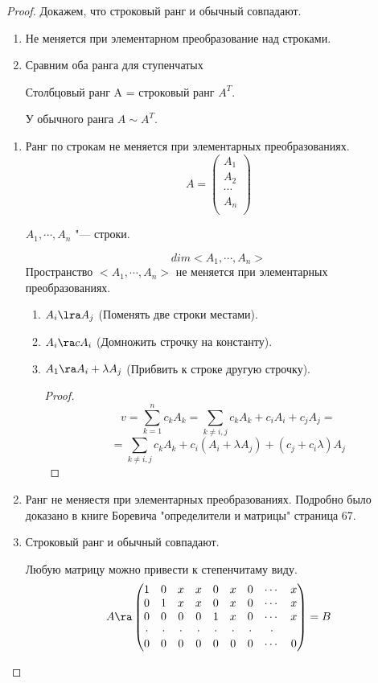\begin{proof}
Докажем, что строковый ранг и обычный совпадают. 
\begin{enumerate}
\item Не меняется при элементарном преобразование над строками.
\item Сравним оба ранга для ступенчатых

Столбцовый ранг A = строковый ранг $A^{T}$.

У обычного ранга $A \sim A^{T}$.

\end{enumerate}

\begin{enumerate}
\item Ранг по строкам не меняется при элементарных преобразованиях.
$$A = \begin{pmatrix}
A_1\\                                         
A_2\\
\cdots\\
A_n\\
\end{pmatrix}$$

$A_1,\cdots, A_n$ "--- строки.

$$dim<A_1, \cdots, A_n>$$ 
Пространство $<A_1, \cdots, A_n>$ не меняется при элементарных преобразованиях.

\begin{enumerate}
\item $A_i \lra A_j$ (Поменять две строки местами).
\item $A_i \ra cA_i$ (Домножить строчку на константу).
\item $A_1 \ra A_i + \lambda A_j$  (Прибвить к строке другую строчку).
      \begin{proof}
      $$v = \sum_{k = 1}^{n} c_k A_k = \sum_{k \ne i, j}c_kA_k + c_iA_i + c_jA_j = $$  
      $$= \sum_{k \ne i, j}c_kA_k + c_i(A_i + \lambda A_j) + (c_j + c_i\lambda)A_j$$
      \end{proof}
\end{enumerate}
\item Ранг не меняестя при элементарных преобразованиях. 
Подробно было доказано в книге Боревича "определители и матрицы" страница 67.
\item  
Строковый ранг и обычный совпадают. 

Любую матрицу можно привести к степенчитаму виду.
$$ 
A \ra
\begin{pmatrix}
1&0&x&x&0&x&0&\cdots&x\\
0&1&x&x&0&x&0&\cdots&x\\
0&0&0&0&1&x&0&\cdots&x\\
\cdot&\cdot&\cdot&\cdot&\cdot&\cdot&\cdot&\cdot\\
0&0&0&0&0&0&0&\cdots&0\\
\end{pmatrix} = B
$$


\end{enumerate}
\end{proof}
